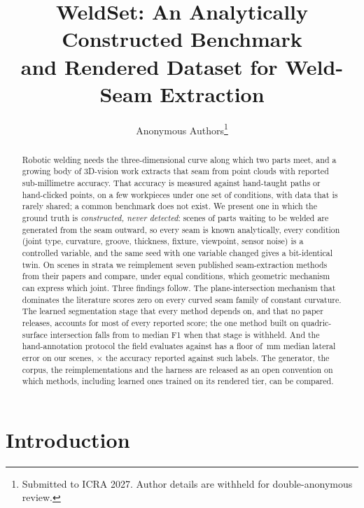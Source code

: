 \documentclass[letterpaper, 10 pt, conference]{ieeeconf}
\title{\LARGE \bf
WeldSet: An Analytically Constructed Benchmark\\ and Rendered Dataset for Weld-Seam Extraction}
\author{Anonymous Authors\thanks{Submitted to ICRA 2027. Author details are withheld for double-anonymous review.}}
\newcommand{\mm}{\,mm}
\begin{document}
\maketitle
\thispagestyle{empty}
\pagestyle{empty}

\begin{abstract}
Robotic welding needs the three-dimensional curve along which two parts meet, and a growing body of 3D-vision work extracts that seam from point clouds with reported sub-millimetre accuracy. That accuracy is measured against hand-taught paths or hand-clicked points, on a few workpieces under one set of conditions, with data that is rarely shared; a common benchmark does not exist. We present one in which the ground truth is \emph{constructed, never detected}: scenes of parts waiting to be welded are generated from the seam outward, so every seam is known analytically, every condition (joint type, curvature, groove, thickness, fixture, viewpoint, sensor noise) is a controlled variable, and the same seed with one variable changed gives a bit-identical twin. On \nScenes{} scenes in \nStrata{} strata we reimplement seven published seam-extraction methods from their papers and compare, under equal conditions, which geometric mechanism can express which joint. Three findings follow. The plane-intersection mechanism that dominates the literature scores zero on every curved seam family of constant curvature. The learned segmentation stage that every method depends on, and that no paper releases, accounts for most of every reported score; the one method built on quadric-surface intersection falls from \quadricLzero{} to \quadricLone{} median F1 when that stage is withheld. And the hand-annotation protocol the field evaluates against has a floor of \annMedian{}\mm{} median lateral error on our scenes, \annRatio$\times$ the accuracy reported against such labels. The generator, the corpus, the reimplementations and the harness are released as an open convention on which methods, including learned ones trained on its rendered tier, can be compared.
\end{abstract}

\section{Introduction}
\end{document}
